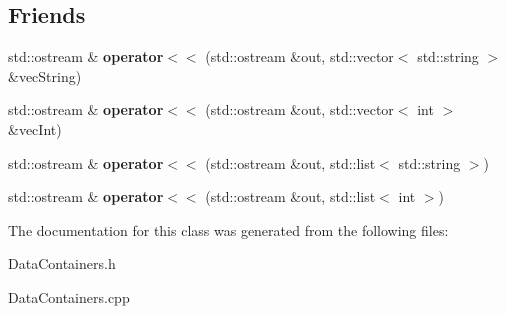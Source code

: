 \subsection*{Friends}
\begin{DoxyCompactItemize}
\item 
\hypertarget{class_data_container_afe77e05dc6854c055657315b56f65ca0}{}std\+::ostream \& {\bfseries operator$<$$<$} (std\+::ostream \&out, std\+::vector$<$ std\+::string $>$ \&vec\+String)\label{class_data_container_afe77e05dc6854c055657315b56f65ca0}

\item 
\hypertarget{class_data_container_a7f53ca2649583eddbd1d5cc5ee318551}{}std\+::ostream \& {\bfseries operator$<$$<$} (std\+::ostream \&out, std\+::vector$<$ int $>$ \&vec\+Int)\label{class_data_container_a7f53ca2649583eddbd1d5cc5ee318551}

\item 
\hypertarget{class_data_container_ad976130a73de0dcf2a1e17e2f9d43b57}{}std\+::ostream \& {\bfseries operator$<$$<$} (std\+::ostream \&out, std\+::list$<$ std\+::string $>$)\label{class_data_container_ad976130a73de0dcf2a1e17e2f9d43b57}

\item 
\hypertarget{class_data_container_a2c408a29c5aa13ba9b661c8b4d5dc485}{}std\+::ostream \& {\bfseries operator$<$$<$} (std\+::ostream \&out, std\+::list$<$ int $>$)\label{class_data_container_a2c408a29c5aa13ba9b661c8b4d5dc485}

\end{DoxyCompactItemize}


The documentation for this class was generated from the following files\+:\begin{DoxyCompactItemize}
\item 
Data\+Containers.\+h\item 
Data\+Containers.\+cpp\end{DoxyCompactItemize}
